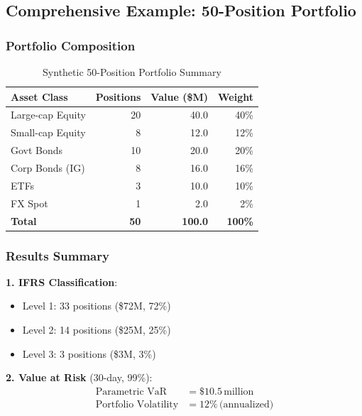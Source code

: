 \documentclass[11pt,a4paper]{article}
\begin{document}
\subsection{Comprehensive Example: 50-Position Portfolio}

\subsubsection{Portfolio Composition}

\begin{table}[h]
\centering
\caption{Synthetic 50-Position Portfolio Summary}
\begin{tabular}{@{}lrrr@{}}
\toprule
Asset Class & Positions & Value (\$M) & Weight \\
\midrule
Large-cap Equity & 20 & 40.0 & 40\% \\
Small-cap Equity & 8 & 12.0 & 12\% \\
Govt Bonds & 10 & 20.0 & 20\% \\
Corp Bonds (IG) & 8 & 16.0 & 16\% \\
ETFs & 3 & 10.0 & 10\% \\
FX Spot & 1 & 2.0 & 2\% \\
\midrule
\textbf{Total} & \textbf{50} & \textbf{100.0} & \textbf{100\%} \\
\bottomrule
\end{tabular}
\end{table}

\subsubsection{Results Summary}

\textbf{1. IFRS Classification}:
\begin{itemize}
    \item Level 1: 33 positions (\$72M, 72\%)
    \item Level 2: 14 positions (\$25M, 25\%)
    \item Level 3: 3 positions (\$3M, 3\%)
\end{itemize}

\textbf{2. Value at Risk} (30-day, 99\%):
\begin{align*}
\text{Parametric VaR} &= \$10.5\,\text{million} \\
\text{Portfolio Volatility} &= 12\%\,\text{(annualized)}
\end{align*}
\end{document}

